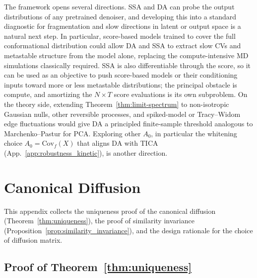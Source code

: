 \documentclass{article}
\newcommand{\Cov}{\mathrm{Cov}}
\begin{document}
The framework opens several directions. SSA and DA can probe the output distributions of any pretrained denoiser, and developing this into a standard diagnostic for fragmentation and slow directions in latent or output space is a natural next step. In particular, score-based models trained to cover the full conformational distribution could allow DA and SSA to extract slow CVs and metastable structure from the model alone, replacing the compute-intensive MD simulations classically required.  SSA is also differentiable through the score, so it can be used as an objective to push score-based models or their conditioning inputs toward more or less metastable distributions; the principal obstacle is compute, and amortizing the $N \times T$ score evaluations is its own subproblem. On the theory side, extending Theorem~\ref{thm:limit-spectrum} to non-isotropic Gaussian nulls, other reversible processes, and spiked-model or Tracy--Widom edge fluctuations would give DA a principled finite-sample threshold analogous to Marchenko--Pastur for PCA. Exploring other $A_0$, in particular the whitening choice $A_0 = \Cov_f(X)$ that aligns DA with TICA (App.~\ref{app:robustness_kinetic}), is another direction.

\clearpage





\newpage
\appendix



\section{Canonical Diffusion}
\label{app:proofs}\label{app:design_rationale}

This appendix collects the uniqueness proof of the canonical diffusion (Theorem~\ref{thm:uniqueness}), the proof of similarity invariance (Proposition~\ref{prop:similarity_invariance}), and the design rationale for the choice of diffusion matrix.


\subsection{Proof of Theorem~\ref{thm:uniqueness}}
\label{app:uniqueness_proof}
\end{document}
